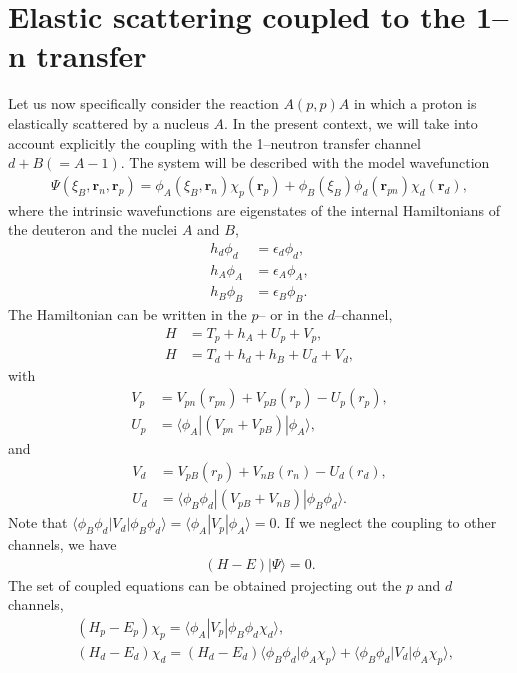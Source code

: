 \documentclass[a4paper,11pt]{article}
\newcommand{\braket}[1]{\langle {#1} \rangle }
\newcommand{\ket}[1]{|{#1} \rangle }
\newcommand{\bra}[1]{\langle {#1}|}
\begin{document}
\section{Elastic scattering coupled to the 1--n transfer}
Let us now specifically consider the reaction $A(p,p)A$ in which a proton is elastically scattered by a nucleus $A$. In the present context, we will take into account explicitly the coupling with the 1--neutron transfer channel $d+B(=A-1)$. The system will be described with the model wavefunction
\begin{align}\label{eq15}
\Psi(\xi_B,\mathbf  r_n,\mathbf r_p)=\phi_A(\xi_B,\mathbf r_n)\chi_p(\mathbf r_p)+\phi_B(\xi_B)\phi_d(\mathbf r_{pn})\chi_d(\mathbf r_d),
\end{align} 
where the intrinsic wavefunctions are eigenstates of the internal Hamiltonians of the deuteron and the nuclei $A$ and $B$,
\begin{align}\label{eq18}
\nonumber h_d\phi_d&=\epsilon_d\phi_d,\\
\nonumber h_A\phi_A&=\epsilon_A\phi_A,\\
h_B\phi_B&=\epsilon_B\phi_B.
\end{align} 
The Hamiltonian can be written in the $p$-- or in the $d$--channel,
\begin{align}\label{eq14}
\nonumber H&=T_p+h_A+U_p+V_p,\\
H&=T_d+h_d+h_B+U_d+V_d,
\end{align}
with
\begin{align}\label{eq16}
\nonumber V_p&=V_{pn}(r_{pn})+V_{pB}(r_p)-U_p(r_p),\\
U_p&=\braket{\phi_A|(V_{pn}+V_{pB})|\phi_A},
\end{align}
and
\begin{align}\label{eq17}
\nonumber V_d&=V_{pB}(r_p)+V_{nB}(r_n)-U_d(r_d),\\
U_d&=\braket{\phi_B\phi_d|(V_{pB}+V_{nB})|\phi_B\phi_d}.
\end{align}
Note that $\braket{\phi_B\phi_d|V_d|\phi_B\phi_d}=\braket{\phi_A|V_p|\phi_A}=0$. If we neglect the coupling to other channels, we have
\begin{align}\label{eq19}
\left(H-E\right)\ket{\Psi}=0.
\end{align}
The set of coupled equations can be obtained projecting out the $p$ and $d$ channels,
\begin{align}\label{eq20}
\nonumber &(H_p-E_p)\chi_p=\bra{\phi_A}V_p\ket{\phi_B\phi_d\chi_d},\\
&(H_d-E_d)\chi_d=(H_d-E_d)\braket{\phi_B\phi_d|\phi_A\chi_p}+\bra{\phi_B\phi_d}V_d\ket{\phi_A\chi_p},
\end{align}
\end{document}
